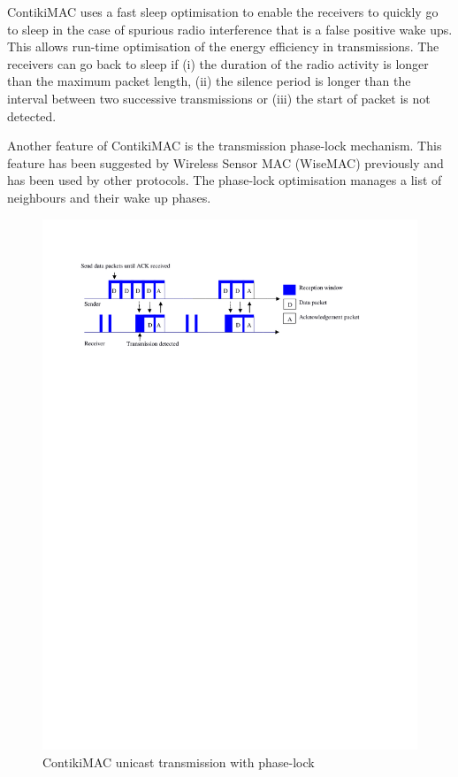 ContikiMAC uses a fast sleep optimisation to enable the receivers to quickly go to sleep in the case of spurious radio interference that is a false positive wake ups. This allows run-time optimisation of the energy efficiency in transmissions. The receivers can go back to sleep if (i) the duration of the radio activity is longer than the maximum packet length, (ii) the silence period is longer than the interval between two successive transmissions or (iii) the start of packet is not detected.

Another feature of ContikiMAC is the transmission phase-lock mechanism. This feature has been suggested by Wireless Sensor MAC (WiseMAC) \cite{wisemac} previously and has been used by other protocols. The phase-lock optimisation manages a list of neighbours and their wake up phases. 

\begin{figure}
\centering
\includegraphics[trim=2cm 22cm 3cm 2cm, clip=true, totalheight=0.22\textheight]{contikimac2.pdf}
\caption{ContikiMAC unicast transmission with phase-lock}
\label{fig_contikimac}
\end{figure}

